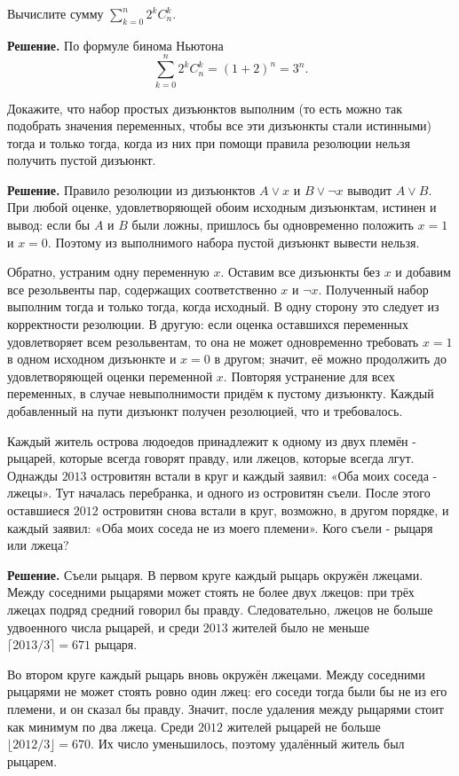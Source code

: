 \begin{problems}
\item Вычислите сумму $\displaystyle\sum_{k=0}^{n} 2^k C_n^k$.
\par\smallskip\noindent\textbf{Решение.} По формуле бинома Ньютона
\[
\sum_{k=0}^{n}2^k C_n^k=(1+2)^n=3^n.
\]\par

\item Докажите, что набор простых дизъюнктов выполним (то есть можно так подобрать значения переменных, чтобы все эти дизъюнкты стали истинными) тогда и только тогда, когда из них при помощи правила резолюции нельзя получить пустой дизъюнкт.
\par\smallskip\noindent\textbf{Решение.} Правило резолюции из дизъюнктов $A\vee x$ и $B\vee\neg x$ выводит $A\vee B$. При любой оценке, удовлетворяющей обоим исходным дизъюнктам, истинен и вывод: если бы $A$ и $B$ были ложны, пришлось бы одновременно положить $x=1$ и $x=0$. Поэтому из выполнимого набора пустой дизъюнкт вывести нельзя.
\par Обратно, устраним одну переменную $x$. Оставим все дизъюнкты без $x$ и добавим все резольвенты пар, содержащих соответственно $x$ и $\neg x$. Полученный набор выполним тогда и только тогда, когда исходный. В одну сторону это следует из корректности резолюции. В другую: если оценка оставшихся переменных удовлетворяет всем резольвентам, то она не может одновременно требовать $x=1$ в одном исходном дизъюнкте и $x=0$ в другом; значит, её можно продолжить до удовлетворяющей оценки переменной $x$. Повторяя устранение для всех переменных, в случае невыполнимости придём к пустому дизъюнкту. Каждый добавленный на пути дизъюнкт получен резолюцией, что и требовалось.\par

\item Каждый житель острова людоедов принадлежит к одному из двух племён - рыцарей, которые всегда говорят правду, или лжецов, которые всегда лгут. Однажды $2013$ островитян встали в круг и каждый заявил: «Оба моих соседа - лжецы». Тут началась перебранка, и одного из островитян съели. После этого оставшиеся $2012$ островитян снова встали в круг, возможно, в другом порядке, и каждый заявил: «Оба моих соседа не из моего племени». Кого съели - рыцаря или лжеца?
\par\smallskip\noindent\textbf{Решение.} Съели рыцаря. В первом круге каждый рыцарь окружён лжецами. Между соседними рыцарями может стоять не более двух лжецов: при трёх лжецах подряд средний говорил бы правду. Следовательно, лжецов не больше удвоенного числа рыцарей, и среди $2013$ жителей было не меньше $\lceil2013/3\rceil=671$ рыцаря.
\par Во втором круге каждый рыцарь вновь окружён лжецами. Между соседними рыцарями не может стоять ровно один лжец: его соседи тогда были бы не из его племени, и он сказал бы правду. Значит, после удаления между рыцарями стоит как минимум по два лжеца. Среди $2012$ жителей рыцарей не больше $\lfloor2012/3\rfloor=670$. Их число уменьшилось, поэтому удалённый житель был рыцарем.\par

\end{problems}

